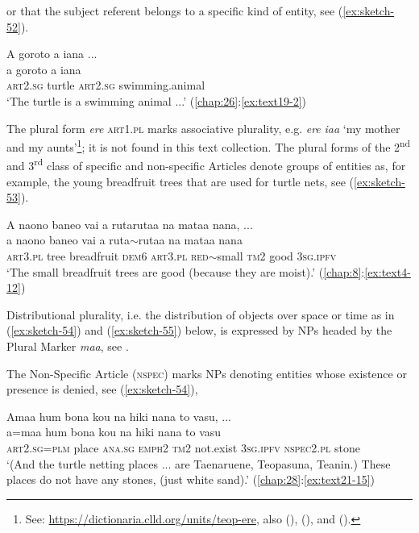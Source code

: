 \documentclass[output=paper]{langscibook}
\begin{document}
\noindent or that the subject referent belongs to a specific kind of entity, see (\ref{ex:sketch-52}).

\ea\label{ex:sketch-52}
    A goroto a iana ...\\
    \gll a	goroto	a	iana\\
    \textsc{art}2.\textsc{sg}	turtle	\textsc{art}2.\textsc{sg}	swimming.animal\\
    \glt `The turtle is a swimming animal ...' (\ref{chap:26}:\ref{ex:text19-2})
\z

The plural form \textit{ere} \textsc{art}1.\textsc{pl} marks associative plurality, e.g. \textit{ere} \textit{iaa} `my mother and my aunts'\footnote{See: \url{https://dictionaria.clld.org/units/teop-ere}, also (\cite[66--67]{Mosel:2014gz}), (\cite[84, 101]{Corbett:2000gy}), and (\cite{Daniel:2013le}).}; it is not found in this text collection. The plural forms of the 2\textsuperscript{nd} and 3\textsuperscript{rd} class of specific and non-specific Articles denote groups of entities as, for example, the young breadfruit trees that are used for turtle nets, see (\ref{ex:sketch-53}).

\ea\label{ex:sketch-53}
    A naono baneo vai a rutarutaa na mataa nana, ...\\
    \gll a	naono	baneo	vai	a	ruta{$\sim$}rutaa	na	mataa	nana\\
    \textsc{art}3.\textsc{pl}	tree	breadfruit	\textsc{dem}6	\textsc{art}3.\textsc{pl}	\textsc{red}{$\sim$}small	\textsc{tm}2	good	3\textsc{sg}.\textsc{ipfv}\\
    \glt `The small breadfruit trees are good (because they are moist).' (\ref{chap:8}:\ref{ex:text4-12})
\z

Distributional plurality, i.e. the distribution of objects over space or time as in (\ref{ex:sketch-54}) and (\ref{ex:sketch-55}) below, is expressed by NPs headed by the Plural Marker \textit{maa}, see .

The Non-Specific Article (\textsc{nspec}) marks NPs denoting entities whose existence or presence is denied, see (\ref{ex:sketch-54}),

\newpage
\ea\label{ex:sketch-54}
    Amaa hum bona kou na hiki nana to vasu, ...\\
    \gll a=maa	hum	bona	kou	na	hiki	nana	to	vasu\\
    \textsc{art}2.\textsc{sg}=\textsc{plm}	place	\textsc{ana}.\textsc{sg}	\textsc{emph}2	\textsc{tm}2	not.exist	3\textsc{sg}.\textsc{ipfv}	\textsc{nspec}2.\textsc{pl}	stone\\
    \glt `(And the turtle netting places ... are Taenaruene, Teopasuna, Teanin.) These places do not have any stones, (just white sand).' (\ref{chap:28}:\ref{ex:text21-15})
\z
\end{document}
